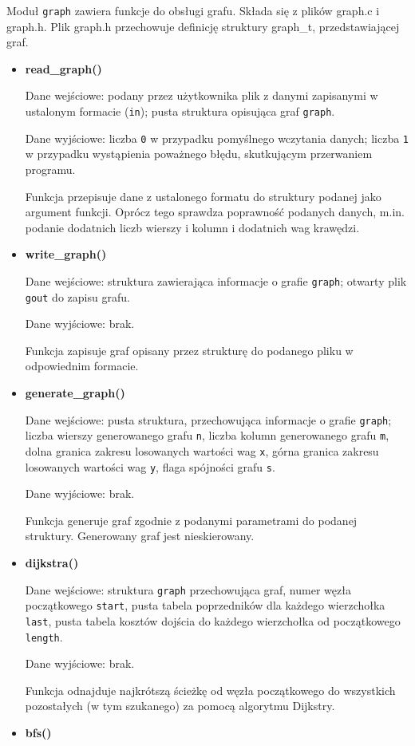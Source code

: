 \documentclass[]{article}
\begin{document}
Moduł \texttt{graph} zawiera funkcje do obsługi grafu. Składa się z plików graph.c i graph.h. Plik graph.h przechowuje definicję struktury graph\_t, przedstawiającej graf.  
\begin{itemize}
\item
   \textbf{read\_graph()}

Dane wejściowe: podany przez użytkownika plik z danymi zapisanymi w ustalonym formacie (\texttt{in}); pusta struktura opisująca graf \texttt{graph}.

Dane wyjściowe: liczba \texttt{0} w przypadku pomyślnego wczytania danych; liczba \texttt{1} w przypadku wystąpienia poważnego błędu, skutkującym przerwaniem programu.

Funkcja przepisuje dane z ustalonego formatu do struktury podanej jako argument funkcji. Oprócz tego sprawdza poprawność podanych danych, m.in. podanie dodatnich liczb wierszy i kolumn i dodatnich wag krawędzi.
\item
  \textbf{write\_graph()}
  
Dane wejściowe: struktura zawierająca informacje o grafie \texttt{graph}; otwarty plik \texttt{gout} do zapisu grafu.

Dane wyjściowe: brak.

Funkcja zapisuje graf opisany przez strukturę do podanego pliku w odpowiednim formacie.
\item
  \textbf{generate\_graph()}
  
Dane wejściowe: pusta struktura, przechowująca informacje o grafie \texttt{graph}; liczba wierszy generowanego grafu \texttt{n}, liczba kolumn generowanego grafu \texttt{m}, dolna granica zakresu losowanych wartości wag \texttt{x}, górna granica zakresu losowanych wartości wag \texttt{y}, flaga spójności grafu \texttt{s}.

Dane wyjściowe: brak.

Funkcja generuje graf zgodnie z podanymi parametrami do podanej struktury. Generowany graf jest nieskierowany.
\item
  \textbf{dijkstra()}

Dane wejściowe: struktura \texttt{graph} przechowująca graf, numer węzła początkowego \texttt{start}, pusta tabela poprzedników dla każdego wierzchołka \texttt{last}, pusta tabela kosztów dojścia do każdego wierzchołka od początkowego \texttt{length}.

Dane wyjściowe: brak.

Funkcja odnajduje najkrótszą ścieżkę od węzła początkowego do wszystkich pozostałych (w tym szukanego) za pomocą algorytmu Dijkstry.
\item
  \textbf{bfs()}


\end{itemize}
\end{document}
